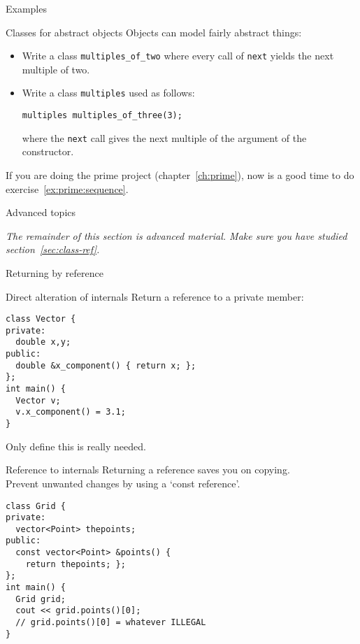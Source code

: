  {Examples}

\begin{block}{Classes for abstract objects}
  \label{sl:intstream}
  Objects can model fairly abstract things:
\end{block}

\begin{exercise}
  \begin{itemize}
  \item
    Write a class \lstinline{multiples_of_two} where every call of
    \lstinline{next} yields the next multiple of two. 
  \item Write a class \lstinline{multiples} used as follows:
\begin{lstlisting}
multiples multiples_of_three(3);      
\end{lstlisting}
  where the \lstinline{next} call gives the next multiple of the
  argument of the constructor.
  \end{itemize}
\end{exercise}

\begin{exercise}
  If you are doing the prime project (chapter~\ref{ch:prime}),
  now is a good time to do exercise~\ref{ex:prime:sequence}.
\end{exercise}



 {Advanced topics}

\emph{The remainder of this section is advanced material. Make sure
  you have studied section~\ref{sec:class-ref}.}

 {Returning by reference}

\begin{block}{Direct alteration of internals}
  \label{sl:obj-return-ref}
  Return a reference to a private member:
\begin{lstlisting}
class Vector {
private:
  double x,y;
public:
  double &x_component() { return x; };
};
int main() {
  Vector v;
  v.x_component() = 3.1;
}
\end{lstlisting}
Only define this is really needed.
\end{block}

\begin{block}{Reference to internals}
  \label{sl:obj-return-const-ref}
  Returning a reference saves you on copying.\\
  Prevent unwanted changes by using a `const reference'.
\begin{lstlisting}
class Grid {
private:
  vector<Point> thepoints;
public:
  const vector<Point> &points() {
    return thepoints; };
};
int main() {
  Grid grid;
  cout << grid.points()[0];
  // grid.points()[0] = whatever ILLEGAL
}
\end{lstlisting}
\end{block}


